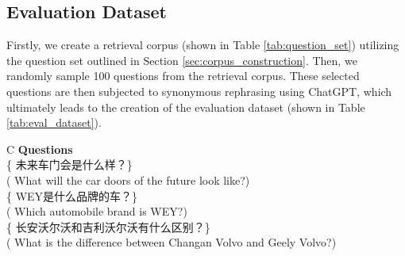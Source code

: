 \documentclass[mathematics,article,submit,moreauthors]{Definitions/mdpi}
\newcommand{\1}[1]{\mathds{1}\left[#1\right]}
\newcommand{\secref}[1]{Section \ref{#1}}
\newcommand{\tableref}[1]{Table \ref{#1}}
\begin{document}
\subsection{Evaluation Dataset}
Firstly, we create a retrieval corpus (shown in \tableref{tab:question_set}) utilizing the question set outlined  in \secref{sec:corpus_construction}. 
Then, we randomly sample 100 questions from the retrieval corpus. These selected questions are then subjected to synonymous rephrasing using ChatGPT, which ultimately leads to the creation of the evaluation dataset (shown in \tableref{tab:eval_dataset}).

\begin{table}[H] 
	\caption{The retrieval corpus consisted of all questions in QA dataset.} \label{tab:question_set}
	\begin{tabularx}{\textwidth}{C}
		\toprule
		\textbf{Questions}	\\
		\midrule
		\{ 未来车门会是什么样？\} \\({\color{blue} What will the car doors of the future look like?})\\
		\midrule
		\{ WEY是什么品牌的车？\} \\({\color{blue} Which automobile brand is WEY?}) \\ \midrule
		\{ 长安沃尔沃和吉利沃尔沃有什么区别？\} \\ ({\color{blue} What is the difference between Changan Volvo and Geely Volvo?})\\
		\bottomrule
	\end{tabularx}
\end{table}
\end{document}
